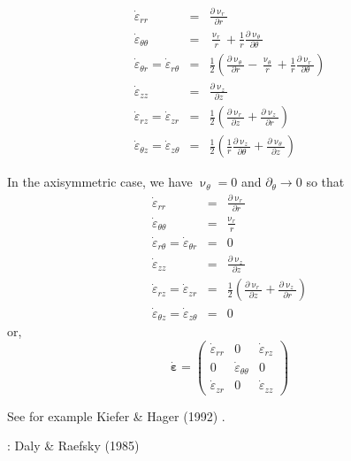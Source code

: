 \begin{eqnarray}
\dot\varepsilon_{rr} 
&=& \frac{\partial \upnu_r}{\partial r} 
\\
\dot\varepsilon_{\theta\theta} 
&=& \frac{\upnu_r}{r} + \frac{1}{r} \frac{\partial \upnu_\theta}{\partial \theta}  
\\
\dot\varepsilon_{\theta r} = \dot\varepsilon_{r\theta} 
&=& \frac{1}{2} \left(   \frac{\partial \upnu_\theta}{\partial r} - \frac{\upnu_\theta}{r} 
+\frac{1}{r} \frac{\partial \upnu_r}{\partial \theta}  \right)
\\
\dot\varepsilon_{zz} 
&=& \frac{\partial \upnu_z}{\partial z} 
\\
\dot{\varepsilon}_{rz} = \dot{\varepsilon}_{zr} 
&=& \frac{1}{2}\left( \frac{\partial \upnu_r}{\partial z} + \frac{\partial \upnu_z}{\partial r}  \right) 
\\
\dot{\varepsilon}_{\theta z} = \dot{\varepsilon}_{z \theta} &=& \frac{1}{2}\left( 
\frac{1}{r} \frac{\partial \upnu_z}{\partial \theta} + \frac{\partial \upnu_\theta}{\partial z}  \right) 
\end{eqnarray}

In the axisymmetric case, we have $\upnu_\theta=0$ and $\partial_\theta \rightarrow 0$ so that 
\begin{eqnarray}
\dot\varepsilon_{rr} &=& \frac{\partial \upnu_r}{\partial r}  \\
\dot\varepsilon_{\theta\theta} &=& \frac{\upnu_r}{r} \\
\dot\varepsilon_{r\theta} = \dot\varepsilon_{\theta r} &=& 0\\
\dot\varepsilon_{zz} &=& \frac{\partial \upnu_z}{\partial z} \\
\dot{\varepsilon}_{rz} = \dot{\varepsilon}_{zr} 
&=& \frac{1}{2}\left( \frac{\partial \upnu_r}{\partial z} + \frac{\partial \upnu_z}{\partial r}  \right) \\
\dot{\varepsilon}_{\theta z} = \dot{\varepsilon}_{z \theta} &=& 0
\end{eqnarray}
or, 
\[
\dot{\bm\varepsilon}
=
\left(
\begin{array}{ccc}
\dot\varepsilon_{rr} & 0 & \dot{\varepsilon}_{rz} \\
0 & \dot{\varepsilon}_{\theta\theta}  & 0 \\
\dot{\varepsilon}_{zr} & 0 & \dot\varepsilon_{zz}
\end{array}
\right)
\]

See for example Kiefer \& Hager (1992) \cite{kiha92}.

\Literature: Daly \& Raefsky (1985) \cite{dara85}


